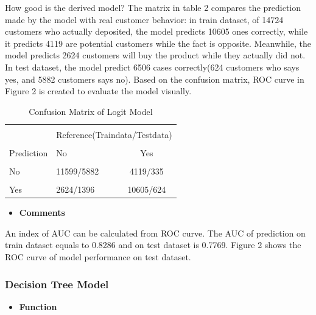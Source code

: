 How good is the derived model? The matrix in table 2 compares the prediction made by the model with real customer behavior: in train dataset, of 14724 customers who actually deposited, the model predicts 10605 ones correctly, while it predicts 4119 are potential customers while the fact is opposite. Meanwhile, the model predicts 2624 customers will buy the product while they actually did not. In test dataset, the model predict 6506 cases correctly(624 customers who says yes, and 5882 customers says no). Based on the confusion matrix, ROC curve in Figure 2 is created to evaluate the model visually. \\
  \begin{center}
  	\begin{table}[!htbp]
  		\centering  
\begin{tabular}{llc}
	\hline
	\hline\\[-1.8ex]
	& \multicolumn{2}{c}{Reference(Traindata/Testdata)} \\
	\cline{2-3}\\[-1.8ex]
	Prediction & No & Yes \\
	\hline \\[-1.8ex] 
	No & 11599/5882 &4119/335 \\ 
	\hline \\[-1.8ex] 
	Yes& 2624/1396 &10605/624\\ 
	\hline
	\hline
\end{tabular}  
\caption{Confusion Matrix of Logit Model} 
\end{table}
\end{center}

\begin{itemize}
	\item \textbf{Comments}
\end{itemize}
\noindent An index of AUC can be calculated from ROC curve. The AUC of prediction on train dataset equals to 0.8286 and on test dataset is 0.7769. Figure 2 shows the ROC curve of model performance on test dataset. \\
	\subsubsection{Decision Tree Model}
	 \begin{itemize}
		\item \textbf{Function}
	\end{itemize}
	
